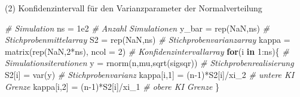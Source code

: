 \documentclass[
  8pt,
  ignorenonframetext,
]{beamer}
\newenvironment{Shaded}{\begin{snugshade}}{\end{snugshade}}
\newcommand{\AttributeTok}[1]{\textcolor[rgb]{0.77,0.63,0.00}{#1}}
\newcommand{\CommentTok}[1]{\textcolor[rgb]{0.56,0.35,0.01}{\textit{#1}}}
\newcommand{\ConstantTok}[1]{\textcolor[rgb]{0.00,0.00,0.00}{#1}}
\newcommand{\ControlFlowTok}[1]{\textcolor[rgb]{0.13,0.29,0.53}{\textbf{#1}}}
\newcommand{\DecValTok}[1]{\textcolor[rgb]{0.00,0.00,0.81}{#1}}
\newcommand{\FloatTok}[1]{\textcolor[rgb]{0.00,0.00,0.81}{#1}}
\newcommand{\FunctionTok}[1]{\textcolor[rgb]{0.00,0.00,0.00}{#1}}
\newcommand{\NormalTok}[1]{#1}
\newcommand{\OtherTok}[1]{\textcolor[rgb]{0.56,0.35,0.01}{#1}}
\newcommand{\SpecialCharTok}[1]{\textcolor[rgb]{0.00,0.00,0.00}{#1}}
\begin{document}
\begin{frame}[fragile]{(2) Konfidenzintervall für den Varianzparameter
der Normalverteilung}
\begin{Shaded}
\begin{Highlighting}[]
\CommentTok{\# Simulation}
\NormalTok{ns      }\OtherTok{=} \FloatTok{1e2}                               \CommentTok{\# Anzahl Simulationen}
\NormalTok{y\_bar   }\OtherTok{=} \FunctionTok{rep}\NormalTok{(}\ConstantTok{NaN}\NormalTok{,ns)                       }\CommentTok{\# Stichprobenmittelarray}
\NormalTok{S2      }\OtherTok{=} \FunctionTok{rep}\NormalTok{(}\ConstantTok{NaN}\NormalTok{,ns)                       }\CommentTok{\# Stichprobenvarianzarray}
\NormalTok{kappa   }\OtherTok{=} \FunctionTok{matrix}\NormalTok{(}\FunctionTok{rep}\NormalTok{(}\ConstantTok{NaN}\NormalTok{,}\DecValTok{2}\SpecialCharTok{*}\NormalTok{ns), }\AttributeTok{ncol =} \DecValTok{2}\NormalTok{)   }\CommentTok{\# Konfidenzintervallarray}
\ControlFlowTok{for}\NormalTok{(i }\ControlFlowTok{in} \DecValTok{1}\SpecialCharTok{:}\NormalTok{ns)\{                             }\CommentTok{\# Simulationsiterationen}
\NormalTok{   y        }\OtherTok{=} \FunctionTok{rnorm}\NormalTok{(n,mu,}\FunctionTok{sqrt}\NormalTok{(sigsqr))      }\CommentTok{\# Stichprobenrealisierung}
\NormalTok{   S2[i]    }\OtherTok{=} \FunctionTok{var}\NormalTok{(y)                        }\CommentTok{\# Stichprobenvarianz}
\NormalTok{   kappa[i,}\DecValTok{1}\NormalTok{]   }\OtherTok{=}\NormalTok{ (n}\DecValTok{{-}1}\NormalTok{)}\SpecialCharTok{*}\NormalTok{S2[i]}\SpecialCharTok{/}\NormalTok{xi\_2          }\CommentTok{\# untere KI Grenze}
\NormalTok{   kappa[i,}\DecValTok{2}\NormalTok{]   }\OtherTok{=}\NormalTok{ (n}\DecValTok{{-}1}\NormalTok{)}\SpecialCharTok{*}\NormalTok{S2[i]}\SpecialCharTok{/}\NormalTok{xi\_1          }\CommentTok{\# obere KI Grenze}
\NormalTok{\}}
\end{Highlighting}
\end{Shaded}
\end{frame}
\end{document}
